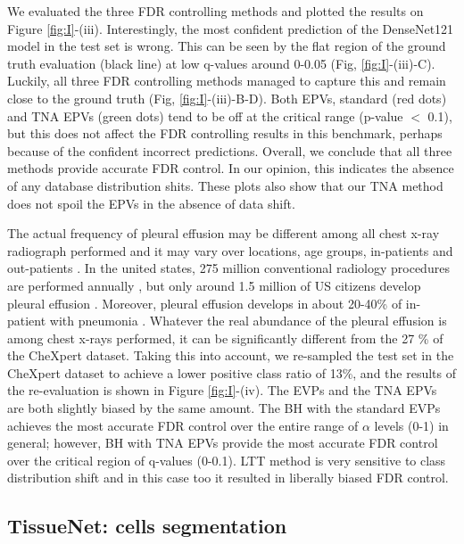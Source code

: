 \documentclass{article}
\begin{document}
We evaluated the three FDR controlling methods and plotted the results on Figure \ref{fig:I}-(iii). Interestingly, the most confident prediction of the DenseNet121 model in the test set is wrong. This can be seen by the flat region of the ground truth evaluation (black line) at low q-values around 0-0.05 (Fig, \ref{fig:I}-(iii)-C). Luckily, all three FDR controlling methods managed to capture this and remain close to the ground truth (Fig, \ref{fig:I}-(iii)-B-D). Both EPVs, standard (red dots) and TNA EPVs (green dots) tend to be off at the critical range (p-value $<$ 0.1), but this does not affect the FDR controlling results in this benchmark, perhaps because of the confident incorrect predictions. Overall, we conclude that all three methods provide accurate FDR control. In our opinion, this indicates the absence of any database distribution shits. These plots also show that our TNA method does not spoil the EPVs in the absence of data shift.

The actual frequency of pleural effusion may be different among all chest x-ray radiograph performed and it may vary over locations, age groups, in-patients and out-patients \cite{Zaki2024,Cashen2017PleuralEA}. In the united states, 275 million conventional radiology procedures are performed annually \cite{mahesh2022patient}, but only around 1.5 million of US citizens develop pleural effusion \cite{Cashen2017PleuralEA}. Moreover, pleural effusion develops in about 20-40\% of in-patient with pneumonia \cite{shebl2018parapneumonic}. Whatever the real abundance of the pleural effusion is among  chest x-rays performed, it can be significantly different from the 27 \% of the CheXpert dataset. Taking this into account, we re-sampled the test set in the CheXpert dataset to achieve a lower positive class ratio of 13\%, and the results of the re-evaluation is shown in Figure \ref{fig:I}-(iv). The EVPs and the TNA EPVs are both slightly biased by the same amount. The BH with the standard EVPs achieves the most accurate FDR control over the entire range of $\alpha$ levels (0-1) in general; however, BH with TNA EPVs provide the most accurate FDR control over the critical region of q-values (0-0.1). LTT method is very sensitive to class distribution shift and in this case too it resulted in liberally biased FDR control.



\subsection{TissueNet: cells segmentation}
\end{document}
